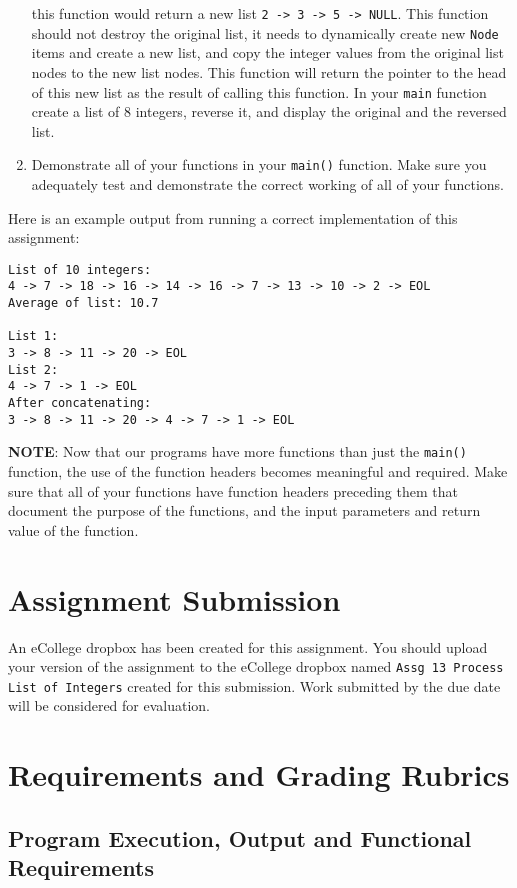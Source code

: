 \documentclass[11pt]{article}
\begin{document}
\begin{enumerate}
   this function would return a new list \verb~2 -> 3 -> 5 -> NULL~.  This
   function should not destroy the original list, it needs to dynamically
   create new \verb~Node~ items and create a new list, and copy the
   integer values from the original list nodes to the new list
   nodes.  This function will return the pointer to the head of this
   new list as the result of calling this function.  In your \verb~main~
   function create a list of 8 integers, reverse it, and display
   the original and the reversed list.
\item Demonstrate all of your functions in your \verb~main()~ function.  Make
   sure you adequately test and demonstrate the correct working of all
   of your functions.
\end{enumerate}


Here is an example output from running a correct implementation of
this assignment:


\begin{verbatim}
List of 10 integers:
4 -> 7 -> 18 -> 16 -> 14 -> 16 -> 7 -> 13 -> 10 -> 2 -> EOL
Average of list: 10.7

List 1:
3 -> 8 -> 11 -> 20 -> EOL
List 2:
4 -> 7 -> 1 -> EOL
After concatenating: 
3 -> 8 -> 11 -> 20 -> 4 -> 7 -> 1 -> EOL
\end{verbatim}

\textbf{NOTE}: Now that our programs have more functions than just the
\verb~main()~ function, the use of the function headers becomes meaningful
and required.  Make sure that all of your functions have function
headers preceding them that document the purpose of the functions, and
the input parameters and return value of the function.
\section*{Assignment Submission}
\label{sec-4}


An eCollege dropbox has been created for this assignment.  You should
upload your version of the assignment to the eCollege dropbox named
\verb~Assg 13 Process List of Integers~ created for this submission.  Work
submitted by the due date will be considered for evaluation.
\section*{Requirements and Grading Rubrics}
\label{sec-5}
\subsection*{Program Execution, Output and Functional Requirements}
\label{sec-5-1}
\end{document}
